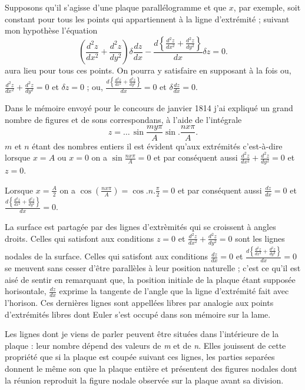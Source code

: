 \documentclass[11pt,a4paper]{article}
\begin{document}
Supposons qu'il s'agisse d'une plaque parallélogramme et que $x$, par exemple,
soit constant pour tous les points qui appartiennent à la ligne d'extrémité ;
suivant mon hypothèse l'équation
\[
  \left( \frac{d^{2}z}{dx^{2}} + \frac{d^{2}z}{dy^{2}} \right) \delta\frac{dz}{dx}
  - \frac{d\left\{ \frac{d^{2}z}{dx^{2}} + \frac{d^{2}z}{dy^{2}} \right\}}{dx}
    \delta z = 0 .
\]
aura lieu pour tous ces points. On pourra y satisfaire en supposant à la fois
ou, $\frac{d^{2}z}{dx^{2}} + \frac{d^{2}z}{dy^{2}} = 0$ et $\delta z = 0$ ;
ou,
$\frac{d\left\{ \frac{d^{2}z}{dx^{2}} + \frac{d^{2}z}{dy^{2}} \right\}}{dx} = 0$
et $\delta\frac{dz}{dx} = 0$.

Dans le mémoire envoyé pour le concours de janvier 1814 j'ai expliqué un grand
nombre de figures et de sons correspondans, à l'aide de l'intégrale
\[
  z = \ldots\, \sin\frac{my\pi}{A} \sin . \frac{nx\pi}{A} .
\]
$m$ et $n$ étant des nombres entiers il est évident qu'aux extrémités
c'est-à-dire lorsque $x = A$ ou $x = 0$ on a $\sin\frac{nx\pi}{A} = 0$ et par
conséquent aussi $\frac{d^{2}z}{dx^{2}} + \frac{d^{2}z}{dy^{2}} = 0$ et
$z = 0$.

Lorsque $x = \frac{A}{2}$ on a $\cos\left( \frac{n x \pi}{A} \right)
= \cos . n . \frac{\pi}{2} = 0$ et par conséquent aussi
$\frac{dz}{dx} = 0$ et
$\frac{d\left\{ \frac{d^{2}z}{dx^{2}} + \frac{d^{2}z}{dy^{2}} \right\}}{dx} = 0$.

La surface est partagée par des lignes d'extrèmités qui se croissent à angles
droits. Celles qui satisfont aux conditions $z = 0$ et
$\frac{d^{2}z}{dx^{2}} + \frac{d^{2}z}{dy^{2}} = 0$ sont les lignes nodales de
la surface. Celles qui satisfont aux conditions $\frac{dz}{dx} = 0$ et
$\frac{d\left\{ \frac{d^{2}z}{dx^{2}} + \frac{d^{2}z}{dy^{2}} \right\}}{dx} = 0$
se meuvent sans cesser d'être parallèles à leur position naturelle ; c'est ce
qu'il est aisé de sentir en remarquant que, la position initiale de la plaque
étant supposée horisontale, $\frac{dz}{dx}$ exprime la tangente de l'angle que
la ligne d'extrémité fait avec l'horison. Ces dernières lignes sont appellées
libres par analogie aux points d'extrémités libres dont Euler s'est occupé
dans son mémoire sur la lame.

Les lignes dont je viens de parler peuvent être situées dans l'intérieure de
la plaque : leur nombre dépend des valeurs de \emph{m} et de \emph{n}. Elles
jouissent de cette propriété que si la plaque est coupée suivant ces lignes,
les parties separées donnent le même son que la plaque entière et présentent
des figures nodales dont la réunion reproduit la figure nodale observée sur la
plaque avant sa division.
\end{document}
